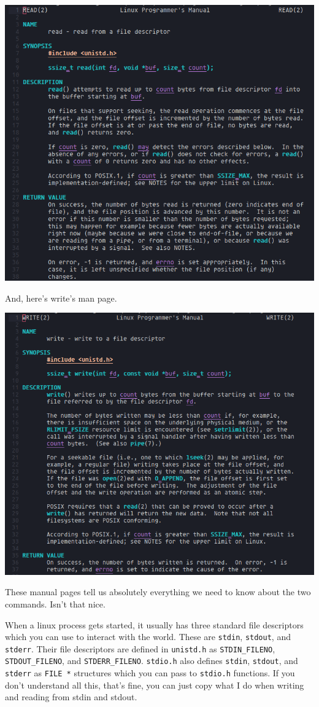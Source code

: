 \documentclass[11pt]{article}
\begin{document}
\begin{center}
\includegraphics[width=.9\linewidth]{./imgs/read.png}
\end{center}

And, here's write's man page.
\begin{center}
\includegraphics[width=.9\linewidth]{./imgs/write.png}
\end{center}

These manual pages tell us absolutely everything we need to know
about the two commands. Isn't that nice.

When a linux process gets started, it usually has three standard
file descriptors which you can use to interact with the
world. These are \texttt{stdin}, \texttt{stdout}, and \texttt{stderr}. Their file
descriptors are defined in \texttt{unistd.h} as \texttt{STDIN\_FILENO},
\texttt{STDOUT\_FILENO}, and \texttt{STDERR\_FILENO}. \texttt{stdio.h} also defines
\texttt{stdin}, \texttt{stdout}, and \texttt{stderr} as \texttt{FILE *} structures which you
can pass to \texttt{stdio.h} functions. If you don't understand all this,
that's fine, you can just copy what I do when writing and reading
from stdin and stdout.
\end{document}
